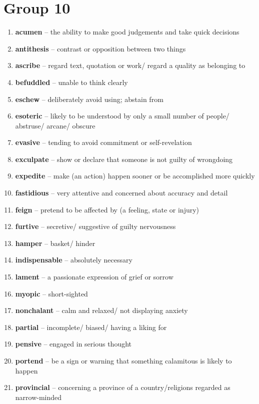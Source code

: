 \newpage
\section{Group 10}

\begin{enumerate}[wide,labelindent=0pt]
\item \textbf{acumen} -- the ability to make good judgements and take quick decisions
\item \textbf{antithesis} -- contrast or opposition between two things
\item \textbf{ascribe} -- regard text, quotation or work/ regard a quality as belonging to
\item \textbf{befuddled} -- unable to think clearly
\item \textbf{eschew} -- deliberately avoid using; abstain from
\item \textbf{esoteric} -- likely to be understood by only a small number of people/ abstruse/ arcane/ obscure
\item \textbf{evasive} -- tending to avoid commitment or self-revelation
\item \textbf{exculpate} -- show or declare that someone is not guilty of wrongdoing
\item \textbf{expedite} -- make (an action) happen sooner or be accomplished more quickly
\item \textbf{fastidious} -- very attentive and concerned about accuracy and detail
\item \textbf{feign} -- pretend to be affected by (a feeling, state or injury)
\item \textbf{furtive} -- secretive/ suggestive of guilty nervousness
\item \textbf{hamper} -- basket/ hinder
\item \textbf{indispensable} -- absolutely necessary
\item \textbf{lament} -- a passionate expression of grief or sorrow
\item \textbf{myopic} -- short-sighted
\item \textbf{nonchalant} -- calm and relaxed/ not displaying anxiety
\item \textbf{partial} -- incomplete/ biased/ having a liking for
\item \textbf{pensive} -- engaged in serious thought
\item \textbf{portend} -- be a sign or warning that something calamitous is likely to happen
\item \textbf{provincial} -- concerning a province of a country/religions regarded as narrow-minded

\end{enumerate}
